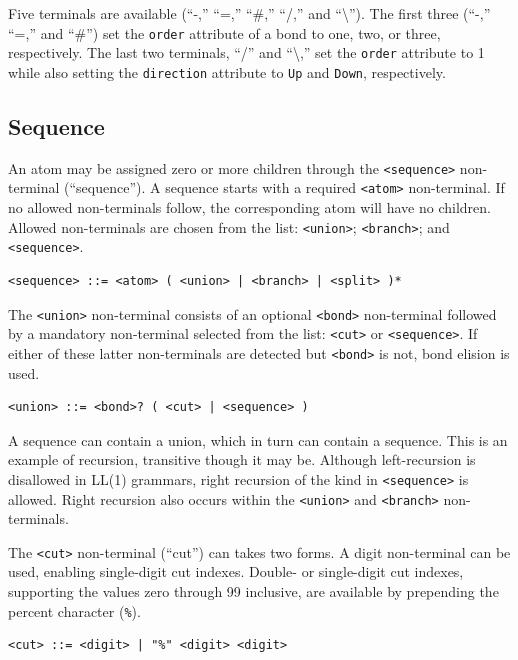 \documentclass{article}
\def\ttt{\texttt}
\begin{document}
Five terminals are available (\enquote{-,} \enquote{=,} \enquote{\#,} \enquote{/,} and \enquote{\textbackslash}). The first three (\enquote{-,} \enquote{=,} and \enquote{\#}) set the \ttt{order} attribute of a bond to one, two, or three, respectively. The last two terminals, \enquote{/} and \enquote{\textbackslash,} set the \ttt{order} attribute to 1 while also setting the \ttt{direction} attribute to \ttt{Up} and \ttt{Down}, respectively.

\subsection*{Sequence}

An atom may be assigned zero or more children through the \ttt{<sequence>} non-terminal (\enquote{sequence}). A sequence starts with a required \ttt{<atom>} non-terminal. If no allowed non-terminals follow, the corresponding atom will have no children. Allowed non-terminals are chosen from the list: \ttt{<union>}; \ttt{<branch>}; and \ttt{<sequence>}.

\begin{lstlisting}
<sequence> ::= <atom> ( <union> | <branch> | <split> )*
\end{lstlisting}

The \ttt{<union>} non-terminal consists of an optional \ttt{<bond>} non-terminal followed by a mandatory non-terminal selected from the list: \ttt{<cut>} or \ttt{<sequence>}. If either of these latter non-terminals are detected but \ttt{<bond>} is not, bond elision is used.

\begin{lstlisting}
<union> ::= <bond>? ( <cut> | <sequence> )
\end{lstlisting}

A sequence can contain a union, which in turn can contain a sequence. This is an example of recursion, transitive though it may be. Although left-recursion is disallowed in LL(1) grammars, right recursion of the kind in \ttt{<sequence>} is allowed. Right recursion also occurs within the \ttt{<union>} and \ttt{<branch>} non-terminals.

The \ttt{<cut>} non-terminal (\enquote{cut}) can takes two forms. A digit non-terminal can be used, enabling single-digit cut indexes. Double- or single-digit cut indexes, supporting the values zero through 99 inclusive, are available by prepending the percent character (\ttt{\%}).

\begin{lstlisting}
<cut> ::= <digit> | "%" <digit> <digit>
\end{lstlisting}
\end{document}
